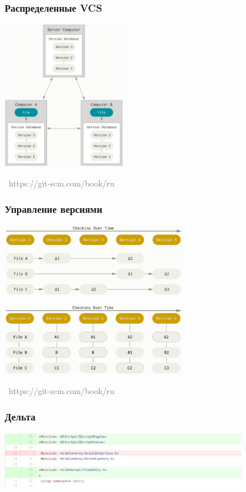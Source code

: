 \documentclass[xetex,mathserif,serif]{beamer}
\newcommand{\attribution}[1] {
	\vspace{-5mm}\begin{flushright}\begin{scriptsize}\textcolor{gray}{\textcopyright\, #1}\end{scriptsize}\end{flushright}
}
\begin{document}
	\begin{frame}
		\frametitle{Распределенные VCS}
		\begin{center}
			\includegraphics[width=0.4\textwidth]{distributedVcs.png}
			\attribution{https://git-scm.com/book/ru}
		\end{center}
	\end{frame}

	\begin{frame}
		\frametitle{Управление версиями}
		\begin{center}
			\includegraphics[width=0.6\textwidth]{deltaVersioning.png}

			\vspace{5mm}
			\includegraphics[width=0.6\textwidth]{snapshotVersioning.png}
			\attribution{https://git-scm.com/book/ru}
		\end{center}
	\end{frame}

	\begin{frame}
		\frametitle{Дельта}
		\begin{center}
			\includegraphics[width=0.8\textwidth]{delta.png}
		\end{center}
	\end{frame}
\end{document}
